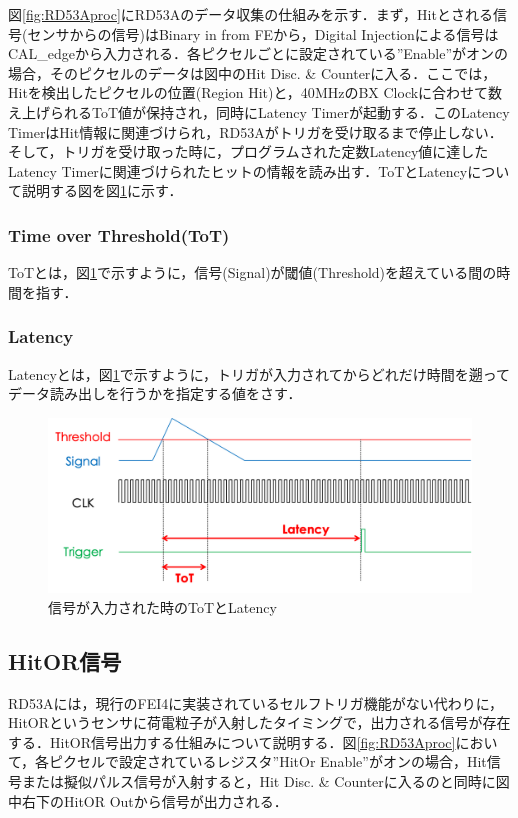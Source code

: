 図\ref{fig:RD53Aproc}にRD53Aのデータ収集の仕組みを示す．まず，Hitとされる信号(センサからの信号)はBinary in from FEから，Digital Injectionによる信号はCAL\_edgeから入力される．各ピクセルごとに設定されている''Enable''がオンの場合，そのピクセルのデータは図中のHit Disc. \& Counterに入る．ここでは，Hitを検出したピクセルの位置(Region Hit)と，40$\mathrm{MHz}$のBX Clockに合わせて数え上げられるToT値が保持され，同時にLatency Timerが起動する．このLatency TimerはHit情報に関連づけられ，RD53Aがトリガを受け取るまで停止しない．そして，トリガを受け取った時に，プログラムされた定数Latency値に達したLatency Timerに関連づけられたヒットの情報を読み出す．ToTとLatencyについて説明する図を図\ref{fig:tot}に示す．

\subsubsection*{Time over Threshold(ToT)}
ToTとは，図\ref{fig:tot}で示すように，信号(Signal)が閾値(Threshold)を超えている間の時間を指す．

\subsubsection*{Latency}
Latencyとは，図\ref{fig:tot}で示すように，トリガが入力されてからどれだけ時間を遡ってデータ読み出しを行うかを指定する値をさす．

\begin{figure}[h]
  \centering
  \includegraphics[width=13cm]{./figure/tot.png}
  \caption{信号が入力された時のToTとLatency}
  \label{fig:tot}
\end{figure}

\subsection{HitOR信号}
RD53Aには，現行のFEI4に実装されているセルフトリガ機能がない代わりに，HitORというセンサに荷電粒子が入射したタイミングで，出力される信号が存在する．HitOR信号出力する仕組みについて説明する．図\ref{fig:RD53Aproc}において，各ピクセルで設定されているレジスタ''HitOr Enable''がオンの場合，Hit信号または擬似パルス信号が入射すると，Hit Disc. \& Counterに入るのと同時に図中右下のHitOR Outから信号が出力される．\par

